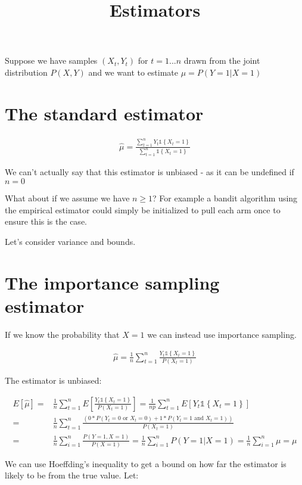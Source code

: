\documentclass{article}
\title{Estimators}
\newcommand{\set}[1]{\left\{#1\right\}}
\newcommand{\ind}[1]{\mathds{1}\!\!\set{#1}}
\newcommand{\eqn}[1]{\begin{align}#1\end{align}}
\theoremstyle{plain}
\theoremstyle{definition}
\begin{document}
\def\ci{\perp\!\!\!\perp}
\maketitle


Suppose we have samples $(X_t,Y_t)$ for $t = 1... n$ drawn from the joint distribution $P(X,Y)$ and we want to estimate $\mu = P(Y=1|X=1)$ 

\section{The standard estimator}

\eqn{
\hat{\mu} = \frac{\sum_{t=1}^n Y_t \ind{X_t=1}}{\sum_{t=1}^n\ind{X_t=1}}
}

We can't actually say that this estimator is unbiased - as it can be undefined if $n = 0$

\color{red}{Is there an unbiased estimator for this simple problem if the $P(X = 1)$ is not known?}\color{black}

What about if we assume we have $n \geq 1$? For example a bandit algorithm using the empirical estimator could simply be initialized to pull each arm once to ensure this is the case.

Let's consider variance and bounds.



\section{The importance sampling estimator}
If we know the probability that $X=1$ we can instead use importance sampling.

\eqn{
\hat{\mu} = \frac{1}{n}\sum_{t=1}^n\frac{Y_t \ind{X_t=1}}{P(X_t=1)}
}

The estimator is unbiased:

\eqn{
E[\hat{\mu}] = &\frac{1}{n}\sum_{t=1}^n E\left[\frac{Y_t \ind{X_t=1}}{P(X_t=1)}\right] = \frac{1}{np}\sum_{t=1}^n E\left[Y_t \ind{X_t=1}\right] \\
= & \frac{1}{n} \sum_{t=1}^n \frac{\left( 0*P(Y_t=0 \text{ or } X_t=0) + 1*P(Y_t = 1 \text{ and } X_t=1) \right)}{P(X_t=1)} \\
= & \frac{1}{n}\sum_{i=1}^n\frac{P(Y=1,X=1)}{P(X=1)} = \frac{1}{n}\sum_{i=1}^{n}P(Y=1|X=1) = \frac{1}{n} \sum_{i=1}^n \mu = \mu
}

We can use Hoeffding's inequality to get a bound on how far the estimator is likely to be from the true value. Let:
\end{document}
